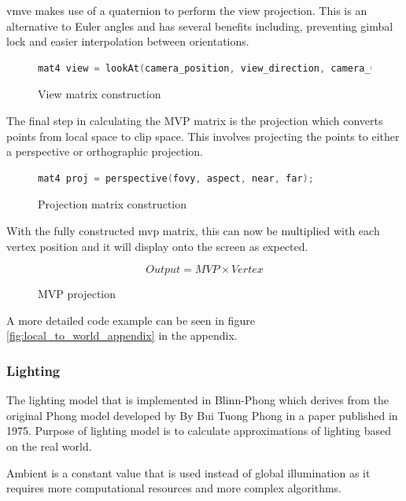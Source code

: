 \documentclass[11pt]{article}
\begin{document}
\gls{vmve} makes use of a quaternion to perform the view projection. This is an
alternative to Euler angles and has several benefits including, preventing gimbal
lock and easier interpolation between orientations.
\begin{figure}[ht]
  \centering
  \begin{lstlisting}[language=C++]
    mat4 view = lookAt(camera_position, view_direction, camera_up);
  \end{lstlisting}
  \caption{View matrix construction}
  \label{fig:world_to_view}
\end{figure}


The final step in calculating the MVP matrix is the projection which converts
points from local space to clip space. This involves projecting the points to
either a perspective or orthographic projection.
\begin{figure}[ht]
  \centering
  \begin{lstlisting}[language=C++]
    mat4 proj = perspective(fovy, aspect, near, far);
  \end{lstlisting}
  \caption{Projection matrix construction}
  \label{fig:local_to_projection}
\end{figure}

With the fully constructed mvp matrix, this can now be multiplied with each
vertex position and it will display onto the screen as expected.
\begin{figure}[h!]
  \centering  
  \begin{equation}
    Output = MVP \times Vertex
  \end{equation}
  \caption{MVP projection}
  \label{fig:mvp_projection}
\end{figure}

A more detailed code example can be seen in figure
\ref{fig:local_to_world_appendix} in the appendix.

\subsubsection{Lighting}

The lighting model that is implemented in Blinn-Phong which derives
from the original Phong model developed by By Bui Tuong Phong in a
paper published in 1975.  Purpose of lighting model is to calculate
approximations of lighting based on the real world.  \cite{blinn}

Ambient is a constant value that is used instead of global illumination
as it requires more computational resources and more complex algorithms.
\end{document}
